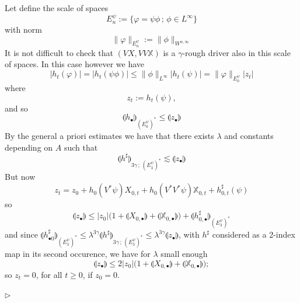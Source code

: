 \documentclass[11pt,a4paper]{amsart}
\numberwithin{equation}{section} %
\newenvironment{Dem}{%
    \begin{list}{\hspace{0.5cm}{\sc Proof --}}{%
        \setlength{\topsep}{0pt}%
        \setlength{\leftmargin}{0pt}%
        \setlength{\rightmargin}{0pt}%
        \setlength{\listparindent}{0pt}%
        \setlength{\itemindent}{0pt}%
        \setlength{\parsep}{0pt}%
        \addtolength{\leftmargin}{20pt}%
        \addtolength{\rightmargin}{0pt}%
    } \item }{\hfill{\space $\rhd$}\end{list}\smallskip}
\begin{document}
\begin{Dem}
Let define the scale of spaces 
$$
E_n^\psi := \big\{\varphi = \psi \phi\,;\,\phi \in L^\infty\big\} 
$$
with norm 
$$
\|\varphi\|_{E_n^\psi} := \|\phi\|_{W^{n,\infty}}
$$ 
It is not difficult to check that $(V X, VV \mathbb{X})$ is a $\gamma$-rough driver also in this scale of spaces. In this case however we have
$$
\big|h_t(\varphi)\big| = \big|h_t ( \psi \phi)\big| \le \|\phi\|_{L^\infty} \big|h_t( \psi)\big| = \|\varphi\|_{E^\psi_0}\big|z_t\big|
$$
where 
$$
z_t := h_t(\psi), 
$$
and so
$$
\llparenthesis h_\bullet\rrparenthesis_{(E_0^\psi)^*}\le \llparenthesis z_\bullet \rrparenthesis
$$
By the general a priori estimates we have that there exists $\lambda$ and constants depending on $A$ such that
$$
\llparenthesis h^\sharp \rrparenthesis_{3\gamma\,;\,(E_3^\psi)^*} \lesssim \llparenthesis z_\bullet \rrparenthesis
$$
But now
$$
z_t = z_0 +  h_{0}(V^* \psi)X_{0,t}+  h_{0}(V^*V^* \psi)\mathbb{X}_{0,t} + h^\sharp_{0,t}(\psi)
$$
so
$$
\llparenthesis z_\bullet \rrparenthesis \le |z_0| \big(1+ \llparenthesis X_{0, \bullet} \rrparenthesis+ \llparenthesis \mathbb{X}_{0,\bullet} \rrparenthesis\big) + \llparenthesis h^\sharp_{0,\bullet} \rrparenthesis_{(E_3^\psi)^*}
$$
and since $  \llparenthesis h^\sharp_{\bullet 0} \rrparenthesis_{(E_3^\psi)^*} \le \lambda^{3\gamma} \llparenthesis h^\sharp \rrparenthesis_{3\gamma\,;\,(E_3^\psi)^*} \le \lambda^{3\gamma}  \llparenthesis z_\bullet \rrparenthesis$, with $h^\sharp$ considered as a 2-index map in its second occurence, we have for $\lambda$ small enough
\begin{equation}
\label{EqGronwall}
\llparenthesis z_\bullet \rrparenthesis \le 2 |z_0| \big(1+ \llparenthesis X_{0, \bullet} \rrparenthesis+ \llparenthesis \mathbb{X}_{0, \bullet} \rrparenthesis\big);
\end{equation}
so $z_t = 0$, for all $t\ge 0$, if $z_0 = 0$.

\bigskip
  

\end{Dem}
\end{document}
